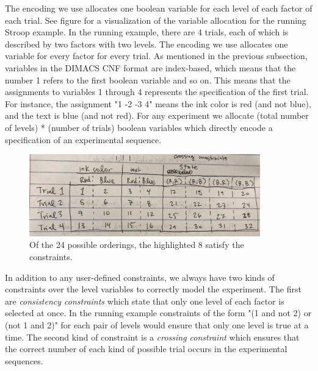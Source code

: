 The encoding we use allocates one boolean variable for each level of each factor of each trial. See figure  for a visualization of the variable allocation for the running Stroop example. In the running example, there are 4 trials, each of which is described by two factors with two levels. The encoding we use allocates one variable for every factor for every trial. As mentioned in the previous subsection, variables in the DIMACS CNF format are index-based, which means that the number 1 refers to the first boolean variable and so on. This means that the assignments to variables 1 through 4 represents the specification of the first trial. For instance, the assignment "1 -2 -3 4" means the ink color is red (and not blue), and the text is blue (and not red). For any experiment we allocate (total number of levels) * (number of trials) boolean variables which directly encode a specification of an experimental sequence.

\begin{figure}[t]
    \centerline{\includegraphics[origin=c,width=10cm]{stroop_crossing_vars}}
    \caption{Of the 24 possible orderings, the highlighted 8 satisfy the constraints.}%
    \label{fig:stroop_crossing_vars}%
\end{figure}


In addition to any user-defined constraints, we always have two kinds of constraints over the level variables to correctly model the experiment. The first are \emph{consistency constraints} which state that only one level of each factor is selected at once. In the running example constraints of the form "(1 and not 2) or (not 1 and 2)" for each pair of levels would ensure that only one level is true at a time. The second kind of constraint is a \emph{crossing constraint} which ensures that the correct number of each kind of possible trial occurs in the experimental sequences.


